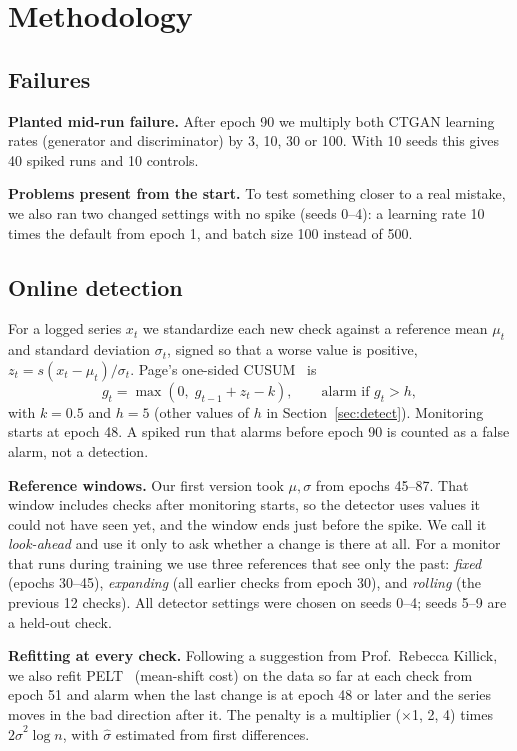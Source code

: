 \documentclass[conference]{IEEEtran}
\begin{document}
\section{Methodology}

\subsection{Failures}
\textbf{Planted mid-run failure.} After epoch 90 we multiply both CTGAN
learning rates (generator and discriminator) by 3, 10, 30 or 100. With 10
seeds this gives 40 spiked runs and 10 controls.

\textbf{Problems present from the start.} To test something closer to a
real mistake, we also ran two changed settings with no spike (seeds 0--4):
a learning rate 10 times the default from epoch 1, and batch size 100
instead of 500.

\subsection{Online detection}
For a logged series $x_t$ we standardize each new check against a
reference mean $\mu_t$ and standard deviation $\sigma_t$, signed so that a
worse value is positive, $z_t = s(x_t-\mu_t)/\sigma_t$. Page's one-sided
CUSUM~\cite{page1954cusum} is
\begin{equation}
g_t = \max(0,\; g_{t-1} + z_t - k), \qquad \text{alarm if } g_t > h,
\end{equation}
with $k=0.5$ and $h=5$ (other values of $h$ in Section~\ref{sec:detect}).
Monitoring starts at epoch 48. A spiked run that alarms before epoch 90 is
counted as a false alarm, not a detection.

\textbf{Reference windows.} Our first version took $\mu,\sigma$ from epochs
45--87. That window includes checks after monitoring starts, so the detector
uses values it could not have seen yet, and the window ends just before the
spike. We call it \emph{look-ahead} and use it only to ask whether a change
is there at all. For a monitor that runs during training we use three
references that see only the past: \emph{fixed} (epochs 30--45),
\emph{expanding} (all earlier checks from epoch 30), and \emph{rolling} (the
previous 12 checks). All detector settings were chosen on seeds 0--4; seeds
5--9 are a held-out check.

\textbf{Refitting at every check.} Following a suggestion from Prof.\
Rebecca Killick, we also refit PELT~\cite{killick2012pelt} (mean-shift cost)
on the data so far at each check from epoch 51 and alarm when the last
change is at epoch 48 or later and the series moves in the bad direction
after it. The penalty is a multiplier ($\times$1, 2, 4) times
$2\hat\sigma^2\log n$, with $\hat\sigma$ estimated from first differences.
\end{document}
